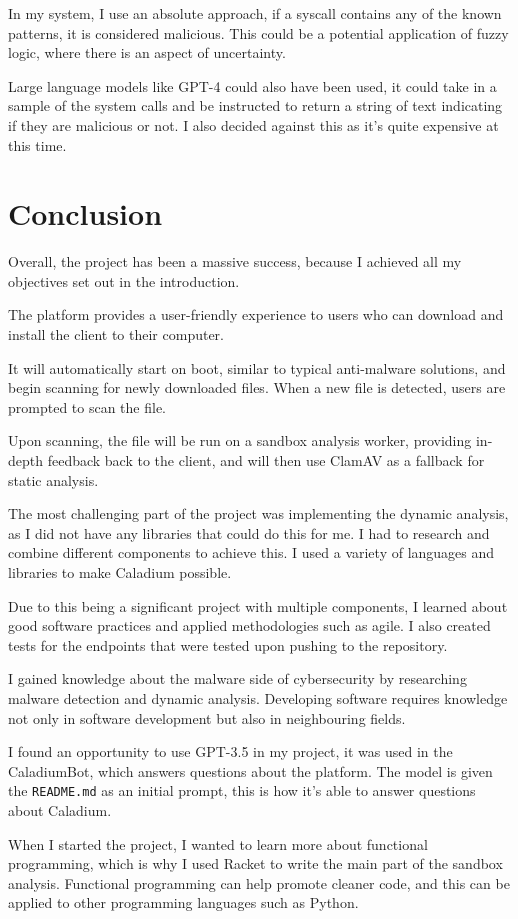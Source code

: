 In my system, I use an absolute approach, 
if a syscall contains any of the known patterns,
it is considered malicious.
This could be a potential application of fuzzy logic,
where there is an aspect of uncertainty.

Large language models like GPT-4 could also have been used,
it could take in a sample of the system calls and
be instructed to return a string of text
indicating if they are malicious or not.
I also decided against this as it's quite expensive at this time.

\section{Conclusion}
Overall, the project has been a massive success,
because I achieved all my objectives set out in the introduction.

The platform provides a user-friendly experience to
users who can download and install the client to their computer.

It will automatically start on boot, similar to typical anti-malware solutions,
and begin scanning for newly downloaded files.
When a new file is detected, users are prompted to scan the file.

Upon scanning, the file will be run on a sandbox analysis worker,
providing in-depth feedback back to the client,
and will then use ClamAV as a fallback for static analysis.

The most challenging part of the project was implementing the dynamic analysis,
as I did not have any libraries that could do this for me.
I had to research and combine different components to achieve this.
I used a variety of languages and libraries to make Caladium possible.

Due to this being a significant project with multiple components,
I learned about good software practices and applied methodologies such as agile.
I also created tests for the endpoints that were tested upon pushing to the repository.

I gained knowledge about the malware side
of cybersecurity by researching malware detection
and dynamic analysis. \cite{10.1145/3329786}
Developing software requires knowledge not only
in software development but also in neighbouring fields.

I found an opportunity to use GPT-3.5 in my project,
it was used in the CaladiumBot, which answers questions about the platform.
The model is given the \texttt{README.md} as an initial prompt,
this is how it's able to answer questions about Caladium.

When I started the project, I wanted to learn more about functional programming,
which is why I used Racket to write the main part of the sandbox analysis.
Functional programming can help promote cleaner code,
and this can be applied to other programming languages such as Python.
